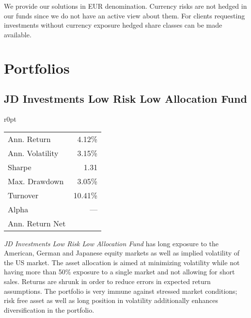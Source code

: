 \documentclass[11pt, parskip=full, DIV=14]{scrreprt}
\begin{document}
We provide our solutions in EUR denomination.
Currency risks are not hedged in our funds since we do not have an active view about them.
For clients requesting investments without currency exposure hedged share classes can be made available.

\chapter*{Portfolios}

\newpage\section*{JD Investments Low Risk Low Allocation Fund}
\begin{mywraptable}{r}{0pt}
  \begin{tabular}{lr}
  \toprule
  Ann. Return & 4.12\%\\
  Ann. Volatility & 3.15\%\\
  Sharpe & 1.31\\
  Max. Drawdown& 3.05\%\\
  Turnover & 10.41\%\\
  Alpha & ---\\
  Ann. Return Net & \\
  \bottomrule
\end{tabular}
\end{mywraptable}
\textit{JD Investments Low Risk Low Allocation Fund} has long exposure to the American, German and Japanese equity markets as well as implied volatility of the US market.
The asset allocation is aimed at minimizing volatility while not having more than 50\% exposure to a single market and not allowing for short sales.
Returns are shrunk in order to reduce errors in expected return assumptions.
The portfolio is very immune against stressed market conditions; risk free asset as well as long position in volatility additionally enhances diversification in the portfolio.
%
\end{document}
